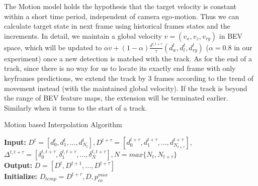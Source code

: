\documentclass[letterpaper, 10pt, conference]{ieeeconf}  %
\begin{document}
The Motion model holds the hypothesis that the target velocity is constant within a short time period, independent of camera ego-motion. Thus we can calculate target state in next frame using historical frames states and the increments. In detail, we maintain a global velocity $v = (v_x, v_z, v_{ry})$ in BEV space, which will be updated to $\alpha v + (1-\alpha) \frac{\delta^{t, t+\tau}}{\tau}(d^t_w, d^t_l, d^t_{ry})$ ($\alpha = 0.8$ in our experiment) once a new detection is matched with the track. As for the end of a track, since there is no way for us to locate its exactly end frame with only keyframes predictions, we extend the track by 3 frames according to the trend of movement instead (with the maintained global velocity). If the track is beyond the range of BEV feature maps, the extension will be terminated earlier. Similarly when it turns to the start of a track.

\begin{algorithm}
	\small
	\caption{Motion based Interpolation Algorithm}
	\label{alg:interpolation}
	\textbf{Input: }$D^t= [d^t_0, d^t_1, ..., d^t_{N_t}], D^{t+\tau}= [d^{t+\tau}_0, d^{t+\tau}_1, ..., d^{t+\tau}_{N_{t+\tau}}],$
	$\Delta^{t, t+\tau}=[\delta^{t, t+\tau}_0, \delta^{t, t+\tau}_1, ..., \delta^{t, t+\tau}_{N}], N = max\{N_t, N_{t+\tau}\}$\\
	\textbf{Output: } $D = [D^t, D^{t+1}, ..., D^{t+\tau}]$\\
	\textbf{Initialize:} $D_{temp} = D^{t+\tau}, D, p_{co}^{max}$ \\
\end{algorithm}
\setlength{\textfloatsep}{1pt}%
\end{document}
